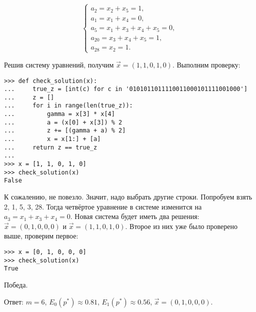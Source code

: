 \documentclass[letterpaper,11pt,openany]{book}
\begin{document}
\begin{equation*}
\begin{cases}
a_2 = x_2 + x_5 = 1, \\
a_1 = x_1 + x_4 = 0, \\
a_5 = x_1 + x_3 + x_4 + x_5 = 0, \\
a_{20} = x_3 + x_4 + x_5 = 1, \\
a_{28} = x_2 = 1.
\end{cases}
\end{equation*}

Решив систему уравнений, получим $\vec{x} = (1, 1, 0, 1, 0)$. Выполним проверку:

\begin{lstlisting}
>>> def check_solution(x):
... 	true_z = [int(c) for c in '0101011011110011000101111001000']
... 	z = []
... 	for i in range(len(true_z)):
... 		gamma = x[3] * x[4]
... 		a = (x[0] + x[3]) % 2
... 		z += [(gamma + a) % 2]
... 		x = x[1:] + [a]
... 	return z == true_z
... 
>>> x = [1, 1, 0, 1, 0]
>>> check_solution(x)
False
\end{lstlisting}

К сожалению, не повезло. Значит, надо выбрать другие строки. Попробуем взять 2, 1, 5, 3, 28. Тогда четвёртое уравнение в системе изменится на $a_3 = x_1 + x_3 + x_4 = 0$. Новая система будет иметь два решения: $\vec{x} = (0, 1, 0, 0, 0)$ и $\vec{x} = (1, 1, 0, 1, 0)$. Второе из них уже было проверено выше, проверим первое:

\begin{lstlisting}
>>> x = [0, 1, 0, 0, 0]
>>> check_solution(x)
True
\end{lstlisting}

Победа.

Ответ: $m = 6$, $E_0 (p^*) \approx 0.81$, $E_1 (p^*) \approx 0.56$, $\vec{x} = (0, 1, 0, 0, 0)$.
\end{document}
